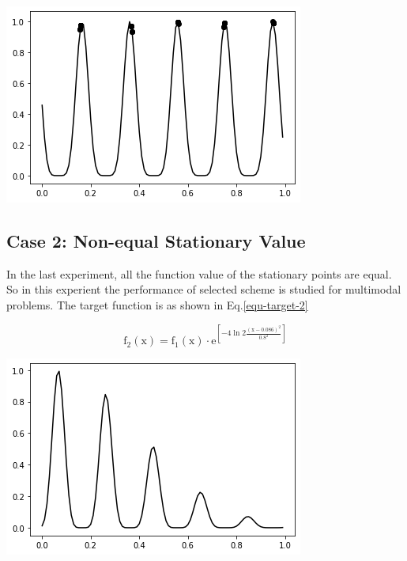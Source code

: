 \documentclass[smallextended]{svjour3}       %
\begin{document}
\begin{multicols}{2}
\begin{center}
  \includegraphics[width=\linewidth]{GA_images/example-sin-result.png}
  \label{fig:sin-result}
\end{center}


\subsection{Case 2: Non-equal Stationary Value}
In the last experiment, all the function value of the stationary points are
equal. So in this experient the performance of selected scheme is studied for
multimodal problems. The target function is as shown in Eq.\ref{equ-target-2}




\begin{equation}
\mathrm{f}_{2}(\mathrm{x})=\mathrm{f}_{1}(\mathrm{x}) \cdot \mathrm{e}^{\left[-4 \ln 2 \frac{(\mathrm{x}-0.086)^{2}}{0.8^{2}}\right]}
\label{equ-target-2}
\end{equation}

\begin{center}
  \includegraphics[width=\linewidth]{GA_images/example-composite-sin.png}
\end{center}


\end{multicols}
\end{document}
